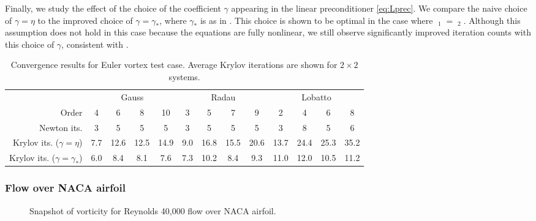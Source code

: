 \documentclass[review]{siamart}
\DeclareMathOperator{\cL}{\widehat{\mathcal{L}}}
\begin{document}
Finally, we study the effect of the choice of the coefficient $\gamma$ appearing
in the linear preconditioner \eqref{eq:Lprec}. We compare the naive choice of
$\gamma = \eta$ to the improved choice of $\gamma = \gamma_*$, where $\gamma_*$
is as in . This choice is shown to be optimal in the case
where $\cL_1 = \cL_2$. Although this assumption does not hold in this case
because the equations are fully nonlinear, we still observe significantly
improved iteration counts with this choice of $\gamma$, consistent with
.
{
\renewcommand{\tabcolsep}{4pt}
\begin{table}
	\centering
	\caption{Convergence results for Euler vortex test case. Average Krylov iterations are shown for $2 \times 2$ systems.}
	\begin{tabular}{r|cccc|cccc|cccc}
		\toprule
		& \multicolumn{4}{c|}{Gauss} & \multicolumn{4}{c|}{Radau} & \multicolumn{4}{c}{Lobatto}\\
		Order & 4 & 6 & 8 & 10 & 3 & 5 & 7 & 9 & 2 & 4 & 6 & 8 \\
		\midrule
		Newton its. & 3 & 5 & 5 & 5 & 3 & 5 & 5 & 5 & 3 & 8 & 5 & 6 \\
		\midrule
		\makecell[r]{Krylov its.\\($\gamma = \eta$)}
		& 7.7 & 12.6 & 12.5 & 14.9 & 9.0 & 16.8 & 15.5 & 20.6 & 13.7 & 24.4 & 25.3 & 35.2 \\[12pt]
		\makecell[r]{Krylov its.\\($\gamma = \gamma_*$)}
		& 6.0 & 8.4 & 8.1 & 7.6 & 7.3 & 10.2 & 8.4 & 9.3 & 11.0 & 12.0 & 10.5 & 11.2 \\
		\bottomrule
	\end{tabular}
\end{table}
}

\subsubsection{Flow over NACA airfoil}

\begin{figure}
	\centering
	\setlength{\fboxsep}{0pt}
	\caption{Snapshot of vorticity for Reynolds 40{,}000 flow over NACA airfoil.}
\end{figure}
\end{document}
